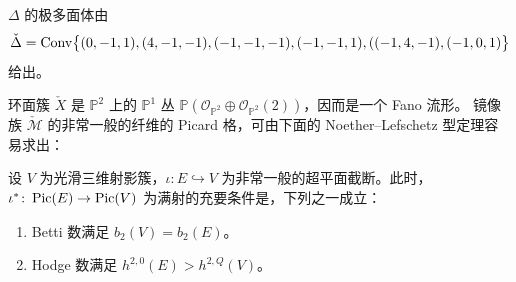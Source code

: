 $\Delta$ 的极多面体由
\[
  \check{\Delta}=\operatorname{Conv}\bigl\{(0,-1,1),(4,-1,-1),(-1,-1,-1),(-1,-1,1),((-1,4,-1),(-1,0,1)\bigr\}
\]
给出。

环面簇 $\check{X}$ 是 $\mathbb{P}^{2}$ 上的 $\mathbb{P}^{1}$ 丛
$\mathbb{P}(\mathcal{O}_{\mathbb{P}^{2}}\oplus\mathcal{O}_{\mathbb{P}^{2}}(2))$，因而是一个 Fano 流形。
镜像族 $\check{\mathcal{M}}$ 的非常一般的纤维的 Picard 格，可由下面的 Noether–Lefschetz 型定理容易求出：

\begin{theorem}
设 $V$ 为光滑三维射影簇，$\iota\colon E\hookrightarrow V$ 为非常一般的超平面截断。此时，
$\iota^{*}\colon\operatorname{Pic}(E)\to\operatorname{Pic}(V)$ 为满射的充要条件是，下列之一成立：
\begin{enumerate}[label=\arabic*.,leftmargin=2.2em]
  \item Betti 数满足 $b_{2}(V)=b_{2}(E)$。
  \item Hodge 数满足 $h^{2,0}(E)>h^{2,Q}(V)$。
\end{enumerate}
\end{theorem}

